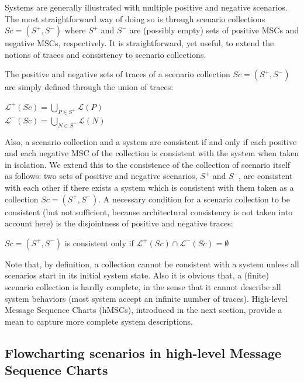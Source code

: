 Systems are generally illustrated with multiple positive and negative scenarios. The most straightforward way of doing so is through scenario collections $Sc = (S^+,S^-)$ where $S^+$ and $S^-$ are (possibly empty) sets of positive MSCs and negative MSCs, respectively. It is straightforward, yet useful, to extend the notions of traces and consistency to scenario collections. 

The positive and negative sets of traces of a scenario collection $Sc = (S^+,S^-)$ are simply defined through the union of traces:

\begin{center}
$\mathcal{L}^+(Sc) = \bigcup_{P \in S^+} \mathcal{L}(P)$ \\
$\mathcal{L}^-(Sc) = \bigcup_{N \in S^-} \mathcal{L}(N)$
\end{center}

Also, a scenario collection and a system are consistent if and only if each positive and each negative MSC of the collection is consistent with the system when taken in isolation. We extend this to the consistence of the collection of scenario itself as follows: two sets of positive and negative scenarios, $S^+$ and $S^-$, are consistent with each other if there exists a system which is consistent with them taken as a collection $Sc = (S^+,S^-)$. A necessary condition for a scenario collection to be consistent (but not sufficient, because architectural consistency is not taken into account here) is the disjointness of positive and negative traces:

\begin{center}
$Sc = (S^+,S^-)$ is consistent only if $\mathcal{L}^+(Sc) \cap \mathcal{L}^-(Sc) = \emptyset$
\end{center}

Note that, by definition, a collection cannot be consistent with a system unless all scenarios start in its initial system state. Also it is obvious that, a (finite) scenario collection is hardly complete, in the sense that it cannot describe all system behaviors (most system accept an infinite number of traces). High-level Message Sequence Charts (hMSCs), introduced in the next section, provide a mean to capture more complete system descriptions.

\subsection[Flowcharting scenarios in high-level MSCs]{Flowcharting scenarios in high-level Message Sequence Charts}

